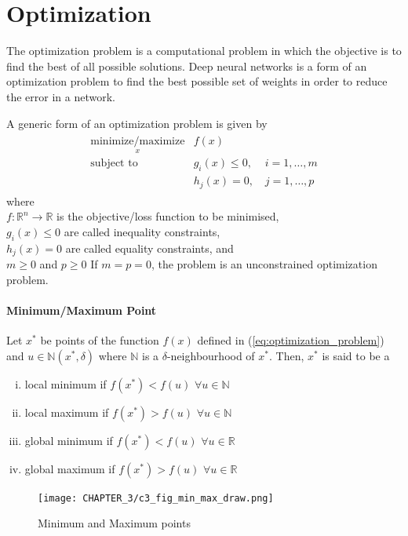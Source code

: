 \chapter{Optimization}
The optimization problem is a computational problem in which the objective is to find the best of all possible solutions. Deep neural networks is a form of an optimization problem to find the best possible set of weights in order to reduce the error in a network.

\noindent A generic form of an optimization problem is given by 
\begin{align}
  \begin{matrix}
    \underset{x}{\text{minimize/maximize}} &f(x) & \\
    \text{subject to} &g_i(x) \leq 0, \, \, & i=1,\dots,m \\
    &h_j(x) = 0, & j=1,\dots,p
  \end{matrix}
  \label{eq:optimization_problem}
\end{align} 
\noindent where \\
\indent $f: \mathbb{R}^n \rightarrow \mathbb{R}$ is the objective/loss function to be minimised,\\
\indent $g_i(x) \leq 0$ are called inequality constraints,\\
\indent $h_j(x) = 0$ are called equality constraints, and \\
\indent $m\geq0$ and $p\geq0$
\noindent If $m=p=0$, the problem is an unconstrained optimization problem.
\subsubsection*{Minimum/Maximum Point}
Let $x^*$  be points of the function $f(x)$ defined in (\ref{eq:optimization_problem}) and $u \in \mathbb{N}(x^*,\delta)$ where $\mathbb{N}$ is a $\delta$-neighbourhood of $x^*$. Then, $x^*$ is said to be a
\begin{enumerate}[(i)]
    \item local minimum if $f(x^*) < f(u)$    $\forall u\in\mathbb{N}$
    \item local  maximum if $f(x^*) > f(u)$ $\forall u\in\mathbb{N}$
    \item global minimum if $f(x^*) < f(u)$ $\forall u\in\mathbb{R}$
    \item global maximum if $f(x^*) > f(u)$ $\forall u\in\mathbb{R}$
\end{enumerate}

\begin{figure}[ht]
    \centering
    \texttt{[image: CHAPTER\_3/c3\_fig\_min\_max\_draw.png]}
    \caption{Minimum and Maximum points}
    \label{fig:min_max_illustration}
\end{figure}
